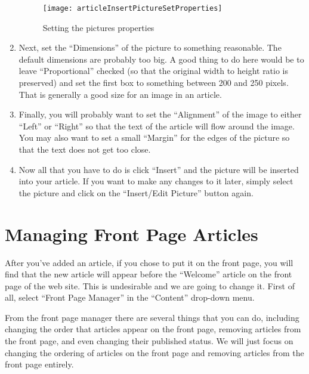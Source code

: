 \documentclass{howto}
\begin{document}
\begin{enumerate}
\begin{figure}
  \begin{center}
    \texttt{[image: articleInsertPictureSetProperties]}
  \end{center}
  \caption{Setting the pictures properties}
  \label{insertPictureSetProperties}
\end{figure}

\item{Next, set the “Dimensions” of the picture to something reasonable.  The default dimensions are probably too big.  A good thing to do here would be to leave “Proportional” checked (so that the original width to height ratio is preserved) and set the first box to something between 200 and 250 pixels.  That is generally a good size for an image in an article.}

\item{Finally, you will probably want to set the “Alignment” of the image to either “Left” or “Right” so that the text of the article will flow around the image.  You may also want to set a small “Margin” for the edges of the picture so that the text does not get too close.}

\item{Now all that you have to do is click “Insert” and the picture will be inserted into your article.  If you want to make any changes to it later, simply select the picture and click on the “Insert/Edit Picture” button again.}
\end{enumerate}

\section{Managing Front Page Articles}


After you've added an article, if you chose to put it on the front page, you will find that the new article will appear before the “Welcome” article on the front page of the web site.  This is undesirable and we are going to change it.  First of all, select “Front Page Manager” in the “Content” drop-down menu.

From the front page manager there are several things that you can do, including changing the order that articles appear on the front page, removing articles from the front page, and even changing their published status.  We will just focus on changing the ordering of articles on the front page and removing articles from the front page entirely.
\end{document}
